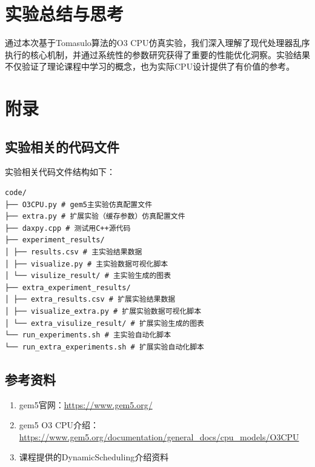 \documentclass[a4paper]{article}
\begin{document}
\section{实验总结与思考}

通过本次基于Tomasulo算法的O3 CPU仿真实验，我们深入理解了现代处理器乱序执行的核心机制，并通过系统性的参数研究获得了重要的性能优化洞察。实验结果不仅验证了理论课程中学习的概念，也为实际CPU设计提供了有价值的参考。

\section{附录}

\subsection{实验相关的代码文件}

实验相关代码文件结构如下：

\begin{verbatim}
code/
├── O3CPU.py # gem5主实验仿真配置文件
├── extra.py # 扩展实验（缓存参数）仿真配置文件
├── daxpy.cpp # 测试用C++源代码
├── experiment_results/
│ ├── results.csv # 主实验结果数据
│ ├── visualize.py # 主实验数据可视化脚本
│ └── visulize_result/ # 主实验生成的图表
├── extra_experiment_results/
│ ├── extra_results.csv # 扩展实验结果数据
│ ├── visualize_extra.py # 扩展实验数据可视化脚本
│ └── extra_visulize_result/ # 扩展实验生成的图表
└── run_experiments.sh # 主实验自动化脚本
└── run_extra_experiments.sh # 扩展实验自动化脚本
\end{verbatim}

\subsection{参考资料}

\begin{enumerate}
    \item gem5官网：\url{https://www.gem5.org/}
    \item gem5 O3 CPU介绍：\url{https://www.gem5.org/documentation/general_docs/cpu_models/O3CPU}
    \item 课程提供的DynamicScheduling介绍资料
\end{enumerate}
\end{document}
